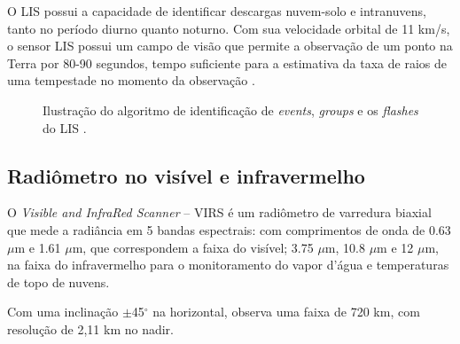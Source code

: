 O LIS possui a capacidade de identificar descargas nuvem-solo e intranuvens, tanto no período diurno quanto noturno.  Com sua velocidade orbital de 11 km/s, o sensor LIS possui um campo de visão que permite a observação de um ponto na Terra por 80-90 segundos, tempo suficiente para a estimativa da taxa de raios de uma tempestade no momento da observação \cite{christianTM,trmmhandbook}.


\begin{figure}[!ht]
\caption{Ilustração do algoritmo de identificação de \textit{events}, \textit{groups} e os \textit{flashes}  do LIS \cite{christian2000LISalgorithm}.}
\label{LisImagemProcessa} 
\end{figure} 



\subsection{Radiômetro no visível e infravermelho}

O \textit{Visible and InfraRed Scanner} -- VIRS é um radiômetro de varredura biaxial que mede a radiância em 5 bandas espectrais: com comprimentos de onda de 0.63 $\mu$m e  1.61 $\mu$m, que correspondem a faixa do visível; 3.75 $\mu$m, 10.8 $\mu$m e 12 $\mu$m, na faixa do infravermelho para o monitoramento do vapor d'água e temperaturas de topo de nuvens. 

Com uma inclinação $\pm$45$^{\circ}$ na horizontal, observa uma faixa de 720 km, com resolução de 2,11 km no nadir\cite{kummerok1998,trmmhandbook}.



